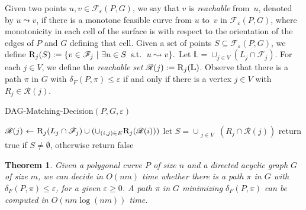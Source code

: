 \documentclass[12pt]{dalthesis}
\newtheorem{theorem}{Theorem}
\newcommand{\lee}{\leqslant}
\newcommand{\gee}{\geqslant}
\newcommand{\set}[1]{{\{ #1 \}}}
\newcommand{\eps}{\varepsilon}
\newcommand{\eq}{{\ \leftarrow\ }}
\newcommand{\CF}{{\mathscr F}}
\newcommand{\CR}{{\mathscr R}}
\newcommand{\distF}{\delta_F}
\newcommand{\CL}{{\mathbb L}}
\newcommand{\F}{\CF}
\newcommand{\R}{\CR}
\newcommand{\RE}{\mbox{\sc R}}
\newcommand{\reach}{\leadsto}
\begin{document}
Given two points $u,v \in \F_\eps(P,G)$, 
we say that $v$ is \emph{reachable} from~$u$,
denoted by $u \reach v$,
if there is a monotone feasible curve from $u$ to~$v$ in $\F_\eps(P,G)$,
where monotonicity in each cell of the surface
is with respect to the orientation of the edges of $P$ and $G$
defining that cell.
Given a set of points $S \subseteq \F_\eps(P,G)$,
we define
$
	\RE_{j}(S) := \set{v \in \F_j \ | \ \exists u \in S \,\mbox{ s.t. }\,  u \reach v}.
$
Let $\CL = \cup_{j \in V} (L_j \cap \F_j)$.
For each $j \in V$, 
we define the \emph{reachable set} $\R(j) := \RE_{j}(\CL)$.
Observe that there is a path $\pi$ in $G$ with $\distF(P, \pi) \lee \eps$
if and only if there is a vertex $j \in V$ with $R_j \in \R(j)$.


\begin{algorithm} [h]
\caption {\sc DAG-Matching-Decision$(P, G, \eps)$} \label{alg:graph}
\begin{algorithmic}[1]
	\vspace{0.5em}
	\baselineskip
		\STATE $\R(j) \eq \RE_j(L_j \cap \F_j) \cup (\cup_{\substack{(i,j) \in E}} \RE_j(\R(i)))$  \label{l:main}
	\ENDFOR 
	\STATE let $S = \cup_{\substack{j \in V}} (R_j \cap \R(j))$
	\STATE return {\sc true} if $S \not= \emptyset$, otherwise return {\sc false}
\end{algorithmic}
\end{algorithm}

\begin{theorem} \label{thm:graph}
	Given a polygonal curve $P$ of size $n$ and a directed acyclic graph $G$ of size $m$, 
	we can decide in $O(nm)$ time whether there is a path $\pi$ in $G$ 
	with $\distF(P, \pi) \lee \eps$, for a given $\eps \gee 0$.
	A path $\pi$ in $G$ minimizing $\distF(P, \pi)$ can be computed in $O(nm \log (nm))$ time.
\end{theorem}
\end{document}
